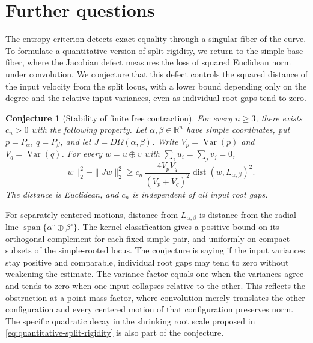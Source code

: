 \documentclass[12pt,reqno]{amsart}
\newtheorem{conjecture}[conjecture]{Conjecture}
\theoremstyle{definition}
\theoremstyle{remark}
\newcommand{\R}{\mathbb R}
\newcommand{\Var}{\operatorname{Var}}
\begin{document}
\section{Further questions}
\label{sec:further-questions}
The entropy criterion detects exact equality through a singular fiber of the curve. To formulate a quantitative version of split rigidity, we return to the simple base fiber, where the Jacobian defect measures the loss of squared Euclidean norm under convolution. We conjecture that this defect controls the squared distance of the input velocity from the split locus, with a lower bound depending only on the degree and the relative input variances, even as individual root gaps tend to zero.

\begin{conjecture}[Stability of finite free contraction]
\label{conj:quantitative-split-rigidity}
For every \(n\geq3\), there exists \(c_n>0\) with the following property.
Let \(\alpha,\beta\in\R^n\) have simple coordinates, put
\(p=P_\alpha\), \(q=P_\beta\), and let
\(J=D\Omega(\alpha,\beta)\).  Write
\(V_p=\Var(p)\) and \(V_q=\Var(q)\).  For every
\(w=u\oplus v\) with \(\sum_i u_i=\sum_jv_j=0\),
\begin{equation}\label{eq:quantitative-split-rigidity}
 \|w\|_2^2-\|Jw\|_2^2
 \geq c_n\,\frac{4V_pV_q}{(V_p+V_q)^2}
          \operatorname{dist}(w,L_{\alpha,\beta})^2.
\end{equation}
The distance is Euclidean, and \(c_n\) is independent of all input
root gaps.
\end{conjecture}

For separately centered motions, distance from \(L_{\alpha,\beta}\) is distance from the radial line \(\operatorname{span}\{\alpha^\circ\oplus\beta^\circ\}\). The kernel classification gives a positive bound on its orthogonal complement for each fixed simple pair, and uniformly on compact subsets of the simple-rooted locus. The conjecture is saying if the input variances stay positive and comparable, individual root gaps may tend to zero without weakening the estimate. The variance factor equals one when the variances agree and tends to zero when one input collapses relative to the other. This reflects the obstruction at a point-mass factor, where convolution merely translates the other configuration and every centered motion of that configuration preserves norm. The specific quadratic decay in the shrinking root scale proposed in \eqref{eq:quantitative-split-rigidity} is also part of the conjecture.
\end{document}
